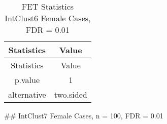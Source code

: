 \documentclass[]{article}
\begin{document}
\begin{longtable}[]{@{}cc@{}}
\caption{FET Statistics IntClust6 Female Cases, FDR =
0.01}\tabularnewline
\toprule
\begin{minipage}[b]{0.18\columnwidth}\centering\strut
Statistics\strut
\end{minipage} & \begin{minipage}[b]{0.14\columnwidth}\centering\strut
Value\strut
\end{minipage}\tabularnewline
\midrule
\endfirsthead
\toprule
\begin{minipage}[b]{0.18\columnwidth}\centering\strut
Statistics\strut
\end{minipage} & \begin{minipage}[b]{0.14\columnwidth}\centering\strut
Value\strut
\end{minipage}\tabularnewline
\midrule
\endhead
\begin{minipage}[t]{0.18\columnwidth}\centering\strut
p.value\strut
\end{minipage} & \begin{minipage}[t]{0.14\columnwidth}\centering\strut
1\strut
\end{minipage}\tabularnewline
\begin{minipage}[t]{0.18\columnwidth}\centering\strut
alternative\strut
\end{minipage} & \begin{minipage}[t]{0.14\columnwidth}\centering\strut
two.sided\strut
\end{minipage}\tabularnewline
\bottomrule
\end{longtable}

\pagebreak
\#\# IntClust7 Female Cases, n = 100, FDR = 0.01
\end{document}
